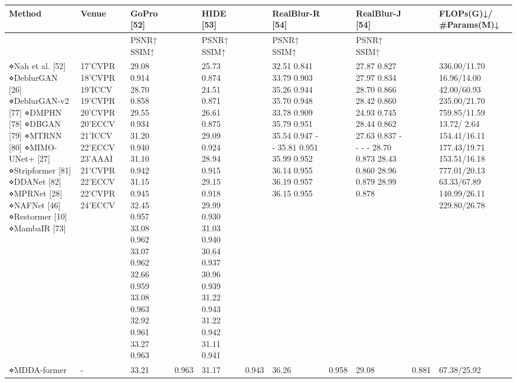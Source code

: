 \begin{tabular}{lllllllllll}
\toprule
Method & Venue & GoPro [52] &  & HIDE [53] &  & RealBlur-R [54] &  & RealBlur-J [54] &  & FLOPs(G)↓/ \#Params(M)↓ \\
\midrule
 &  & PSNR↑ SSIM↑ &  & PSNR↑ SSIM↑ &  & PSNR↑ SSIM↑ &  & PSNR↑ SSIM↑ &  &  \\
⋄Nah et al. [52] ⋄DeblurGAN [26] ⋄DeblurGAN-v2 [77] ⋄DMPHN [78] ⋄DBGAN [79] ⋄MTRNN [80] ⋄MIMO-UNet+ [27] ⋄Stripformer [81] ⋄DDANet [82] ⋄MPRNet [28] ⋄NAFNet [46] ⋄Restormer [10] ⋄MambaIR [73] & 17’CVPR 18’CVPR 19’ICCV 19’CVPR 20’CVPR 20’ECCV 21’ICCV 22’ECCV 23’AAAI 21’CVPR 22’ECCV 22’CVPR 24’ECCV & 29.08 0.914 28.70 0.858 29.55 0.934 31.20 0.940 31.10 0.942 31.15 0.945 32.45 0.957 33.08 0.962 33.07 0.962 32.66 0.959 33.08 0.963 32.92 0.961 33.27 0.963 &  & 25.73 0.874 24.51 0.871 26.61 0.875 29.09 0.924 28.94 0.915 29.15 0.918 29.99 0.930 31.03 0.940 30.64 0.937 30.96 0.939 31.22 0.943 31.22 0.942 31.11 0.941 &  & 32.51 0.841 33.79 0.903 35.26 0.944 35.70 0.948 33.78 0.909 35.79 0.951 35.54 0.947 - - 35.81 0.951 35.99 0.952 36.14 0.955 36.19 0.957 36.15 0.955 &  & 27.87 0.827 27.97 0.834 28.70 0.866 28.42 0.860 24.93 0.745 28.44 0.862 27.63 0.837 - - - - 28.70 0.873 28.43 0.860 28.96 0.879 28.99 0.878 &  & 336.00/11.70 16.96/14.00 42.00/60.93 235.00/21.70 759.85/11.59 13.72/ 2.64 154.41/16.11 177.43/19.71 153.51/16.18 777.01/20.13 63.33/67.89 140.99/26.11 229.80/26.78 \\
⋄MDDA-former & - & 33.21 & 0.963 & 31.17 & 0.943 & 36.26 & 0.958 & 29.08 & 0.881 & 67.38/25.92 \\
\bottomrule
\end{tabular}
